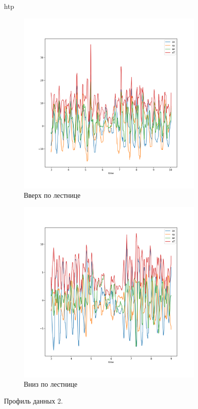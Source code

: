 \documentclass[12pt, fleqn, unicode]{article}
\begin{document}
\begin{figure}{htp}
    \begin{subfigure}[b]{0.5\textwidth}
        \centering
        \includegraphics[width=.9\linewidth]{../pics/raw_go_up.png}
        \caption{Вверх по лестнице}
        \label{fig:sfig1}
    \end{subfigure}%
    \begin{subfigure}[b]{0.5\textwidth}
        \centering
        \includegraphics[width=.9\linewidth]{../pics/raw_go_down.png}
        \caption{Вниз по лестнице}
        \label{fig:sfig2}
    \end{subfigure}
    \caption{Профиль данных 2.}
    \label{fig:fig}
\end{figure}
\end{document}
